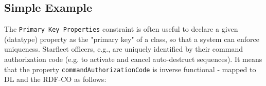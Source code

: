 \documentclass{llncs}
\newcommand{\ms}[1]{\texttt{#1}}
\newenvironment{gcotable}{
  \scriptsize
  \sffamily
  \vspace{0cm}
	\begin{center}
	\textbf{\vspace{0.4cm}Mapping to RDF-CO:} \\
  \begin{tabular}{l|l|l|l|l|l|l}
	\hline
  \textbf{c. type} & \textbf{context class} & \textbf{left p. list} & \textbf{right p. list} & \textbf{classes} & \textbf{c. element} & \textbf{c. value} \\
  \hline

}{
  \hline
  \end{tabular}
	\end{center}
}
\newenvironment{DL}{
  \vspace{0cm}
	\begin{center}
  \begin{tabular}{r l}

}{
  \end{tabular}
	\end{center}
}
\begin{document}
%
%
%
%
%
%
%
%
%
%
%

\subsection{Simple Example}

The \ms{Primary Key Properties} constraint is often useful to declare a given (datatype) property as the "primary key" of a class, so that a system can enforce uniqueness. 
Starfleet officers, e.g., are uniquely identified by their command authorization code (e.g. to activate and cancel auto-destruct sequences).
It means that the property \ms{commandAuthorizationCode} is inverse functional - mapped to DL and the RDF-CO as follows:
\end{document}
